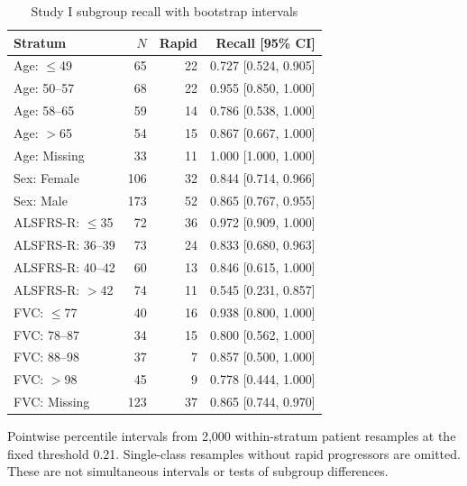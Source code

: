 \begin{table}[ht!]
\centering
\small
\caption[Study I subgroup recall with bootstrap intervals]{Study I subgroup recall with bootstrap intervals}
\label{tab:review_s1_subgroup_ci}
\setlength{\tabcolsep}{4pt}
\begin{tabular}{lrrr}
\toprule
Stratum & $N$ & Rapid & Recall [95\% CI] \\
\midrule
Age: $\leq$49 & 65 & 22 & 0.727 [0.524, 0.905] \\
Age: 50--57 & 68 & 22 & 0.955 [0.850, 1.000] \\
Age: 58--65 & 59 & 14 & 0.786 [0.538, 1.000] \\
Age: $>$65 & 54 & 15 & 0.867 [0.667, 1.000] \\
Age: Missing & 33 & 11 & 1.000 [1.000, 1.000] \\
Sex: Female & 106 & 32 & 0.844 [0.714, 0.966] \\
Sex: Male & 173 & 52 & 0.865 [0.767, 0.955] \\
ALSFRS-R: $\leq$35 & 72 & 36 & 0.972 [0.909, 1.000] \\
ALSFRS-R: 36--39 & 73 & 24 & 0.833 [0.680, 0.963] \\
ALSFRS-R: 40--42 & 60 & 13 & 0.846 [0.615, 1.000] \\
ALSFRS-R: $>$42 & 74 & 11 & 0.545 [0.231, 0.857] \\
FVC: $\leq$77 & 40 & 16 & 0.938 [0.800, 1.000] \\
FVC: 78--87 & 34 & 15 & 0.800 [0.562, 1.000] \\
FVC: 88--98 & 37 & 7 & 0.857 [0.500, 1.000] \\
FVC: $>$98 & 45 & 9 & 0.778 [0.444, 1.000] \\
FVC: Missing & 123 & 37 & 0.865 [0.744, 0.970] \\
\bottomrule
\end{tabular}
\par\smallskip
\begin{minipage}{0.98\linewidth}\footnotesize
Pointwise percentile intervals from 2,000 within-stratum patient resamples at the fixed threshold 0.21. Single-class resamples without rapid progressors are omitted. These are not simultaneous intervals or tests of subgroup differences.
\end{minipage}
\end{table}
